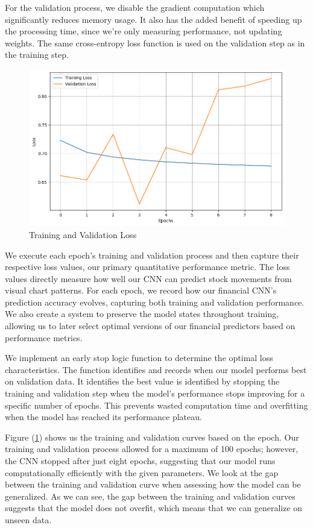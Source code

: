 \documentclass[12pt]{article}
\begin{document}
For the validation process, we disable the gradient computation which significantly reduces memory usage. It also has the added benefit of speeding up the processing time, since we're only measuring performance, not updating weights. The same cross-entropy loss function is used on the validation step as in the training step.

\begin{figure}[h]
	\centering
	\includegraphics[width=.65\linewidth]{plots/training_validation.png}
	\caption{Training and Validation Loss}
	\label{fig:epoch_loss}
\end{figure}

We execute each epoch's training and validation process and then capture their respective loss values, our primary quantitative performance metric. The loss values directly measure how well our CNN can predict stock movements from visual chart patterns. For each epoch, we record how our financial CNN's prediction accuracy evolves, capturing both training and validation performance. We also create a system to preserve the model states throughout training, allowing us to later select optimal versions of our financial predictors based on performance metrics.

We implement an early stop logic function to determine the optimal loss characteristics. The function identifies and records when our model performs best on validation data. It identifies the best value is identified by stopping the training and validation step when the model's performance stops improving for a specific number of epochs. This prevents wasted computation time and overfitting when the model has reached its performance plateau.

Figure (\ref{fig:epoch_loss}) shows us the training and validation curves based on the epoch. Our training and validation process allowed for a maximum of 100 epochs; however, the CNN stopped after just eight epochs, suggesting that our model runs computationally efficiently with the given parameters. We look at the gap between the training and validation curve when assessing how the model can be generalized. As we can see, the gap between the training and validation curves suggests that the model does not overfit, which means that we can generalize on unseen data.
\end{document}
